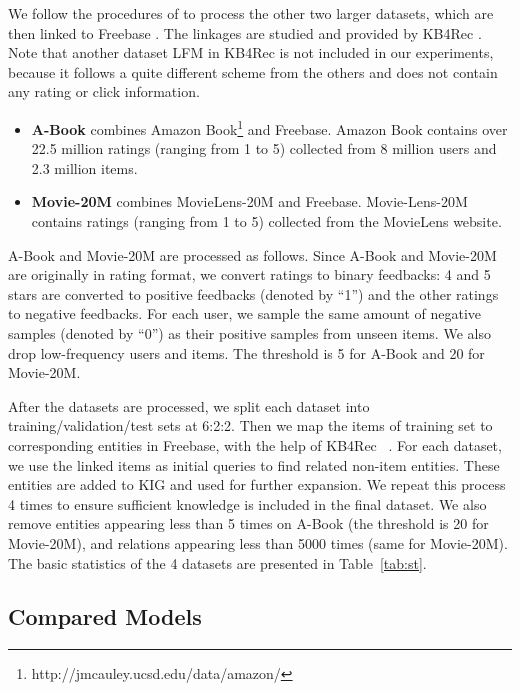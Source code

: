 \documentclass[sigconf]{acmart}
\begin{document}
We follow the procedures of \cite{wang2018ripplenet} to process the other two larger datasets, which are then linked to Freebase \cite{bollacker2008freebase}. The linkages are studied and provided by KB4Rec \cite{zhao2018kb4rec}. Note that another dataset LFM in KB4Rec is not included in our experiments, because it follows a quite different scheme from the others and does not contain any rating or click information.

\begin{itemize}
\item \textbf{A-Book} combines Amazon Book\footnote{http://jmcauley.ucsd.edu/data/amazon/} and Freebase. Amazon Book \cite{he2016ups}
contains over 22.5 million ratings (ranging from 1 to 5) collected from 8 million users and 2.3 million items.
\item \textbf{Movie-20M} combines MovieLens-20M and Freebase. Movie-Lens-20M contains ratings (ranging from 1 to 5) collected from the MovieLens website.
\end{itemize}

A-Book and Movie-20M are processed as follows.
Since A-Book and Movie-20M are originally in rating format, we convert ratings to binary feedbacks: 4 and 5 stars are converted to positive feedbacks (denoted by ``1'') and the other ratings to negative feedbacks.
For each user, we sample the same amount of negative samples (denoted by ``0'') as their positive samples from unseen items.
We also drop low-frequency users and items.
The threshold is 5 for A-Book and  20 for Movie-20M. 

After the datasets are processed, we split each dataset into training/validation/test sets at 6:2:2.
Then we map the items of training set to corresponding entities in Freebase, with the help of KB4Rec ~\cite{zhao2018kb4rec}.
For each dataset, we use the linked items as initial queries to find related non-item entities.
These entities are added to KIG and used for further expansion.
We repeat this process 4 times to ensure sufficient knowledge is included in the final dataset.
We also remove entities appearing less than 5 times on A-Book (the threshold is 20 for Movie-20M), and relations appearing less than 5000 times (same for Movie-20M).
The basic statistics of the 4 datasets are presented in Table~\ref{tab:st}.

\subsection{Compared Models}
\end{document}
